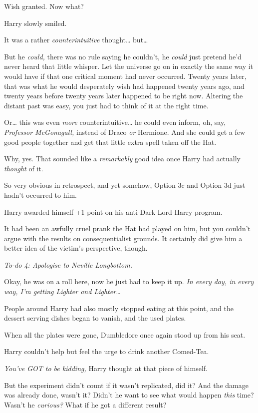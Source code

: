 Wish granted. Now what?

Harry slowly smiled.

It was a rather \emph{counterintuitive} thought\ldots{} but\ldots{}

But he \emph{could,} there was no rule saying he couldn't, he
\emph{could} just pretend he'd never heard that little whisper. Let the
universe go on in exactly the same way it would have if that one
critical moment had never occurred. Twenty years later, that was what he
would desperately wish had happened twenty years ago, and twenty years
before twenty years later happened to be right now. Altering the distant
past was easy, you just had to think of it at the right time.

Or\ldots{} this was even \emph{more} counterintuitive\ldots{} he could
even inform, oh, say, \emph{Professor McGonagall,} instead of Draco
\emph{or} Hermione. And she could get a few good people together and get
that little extra spell taken off the Hat.

Why, yes. That sounded like a \emph{remarkably} good idea once Harry had
actually \emph{thought} of it.

So very obvious in retrospect, and yet somehow, Option 3c and Option 3d
just hadn't occurred to him.

Harry awarded himself +1 point on his anti-Dark-Lord-Harry program.

It had been an awfully cruel prank the Hat had played on him, but you
couldn't argue with the results on consequentialist grounds. It
certainly did give him a better idea of the victim's perspective,
though.

\emph{To-do 4: Apologise to Neville Longbottom.}

Okay, he was on a roll here, now he just had to keep it up. \emph{In
every day, in every way, I'm getting Lighter and Lighter\ldots{}}

People around Harry had also mostly stopped eating at this point, and
the dessert serving dishes began to vanish, and the used plates.

When all the plates were gone, Dumbledore once again stood up from his
seat.

Harry couldn't help but feel the urge to drink another Comed-Tea.

\emph{You've GOT to be kidding,} Harry thought at that piece of himself.

But the experiment didn't count if it wasn't replicated, did it? And the
damage was already done, wasn't it? Didn't he want to see what would
happen \emph{this} time? Wasn't he \emph{curious?} What if he got a
different result?


